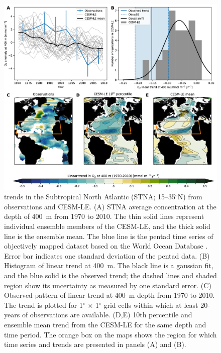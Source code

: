 \documentclass{report_chapter}
\begin{document}
\begin{figure}[tbp]
\centering
\includegraphics[width=1\textwidth]{obs-cesm-stna-trends.png}
\caption{\OO{} trends in the Subtropical North Atlantic (STNA; 15--35$^\circ$N) from observations and CESM-LE.
(A) STNA average \OO{} concentration at the depth of 400~m from 1970 to 2010.
The thin solid lines represent individual ensemble members of the CESM-LE, and the thick solid line is the ensemble mean.
The blue line is the pentad time series of objectively mapped \OO{} dataset based on the World Ocean Database \citep{Ito-Minobe-etal-2017}.
Error bar indicates one standard deviation of the pentad data.
(B) Histogram of linear \OO{} trend at 400~m.
The black line is a gaussian fit, and the blue solid is the observed trend; the dashed lines and shaded region show its uncertainty as measured by one standard error.
(C) Observed pattern of linear trend at 400~m depth from 1970 to 2010.
The trend is plotted for 1$^\circ$ $\times$ 1$^\circ$ grid cells within which at least 20-years of observations are available.
(D,E) 10th percentile and ensemble mean trend from the CESM-LE for the same depth and time period.
The orange box on the maps shows the region for which time series and trends are presented in panels (A) and (B).
}
\label{fig:test_trend_STNA}
\end{figure}
\end{document}
